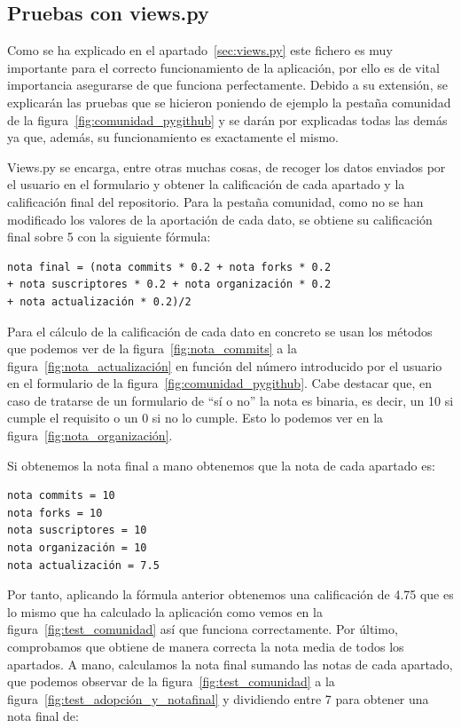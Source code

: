 \documentclass[a4paper, 12pt]{book}
\begin{document}
\subsection{Pruebas con views.py}

Como se ha explicado en el apartado~\ref{sec:views.py} este fichero es muy importante para el correcto funcionamiento de la aplicación, por ello es de vital importancia asegurarse de que funciona perfectamente. Debido a su extensión, se explicarán las pruebas que se hicieron poniendo de ejemplo la pestaña comunidad de la figura~\ref{fig:comunidad_pygithub} y se darán por explicadas todas las demás ya que, además, su funcionamiento es exactamente el mismo.

Views.py se encarga, entre otras muchas cosas, de recoger los datos enviados por el usuario en el formulario y obtener la calificación de cada apartado y la calificación final del repositorio. Para la pestaña comunidad, como no se han modificado los valores de la aportación de cada dato, se obtiene su calificación final sobre 5 con la siguiente fórmula:

\begin{verbatim}
nota final = (nota commits * 0.2 + nota forks * 0.2
+ nota suscriptores * 0.2 + nota organización * 0.2 
+ nota actualización * 0.2)/2
\end{verbatim}

Para el cálculo de la calificación de cada dato en concreto se usan los métodos que podemos ver de la figura~\ref{fig:nota_commits} a la figura~\ref{fig:nota_actualización} en función del número introducido por el usuario en el formulario de la figura~\ref{fig:comunidad_pygithub}. Cabe destacar que, en caso de tratarse de un formulario de ``sí o no'' la nota es binaria, es decir, un 10 si cumple el requisito o un 0 si no lo cumple. Esto lo podemos ver en la figura~\ref{fig:nota_organización}.

Si obtenemos la nota final a mano obtenemos que la nota de cada apartado es:

\begin{verbatim}
nota commits = 10
nota forks = 10
nota suscriptores = 10
nota organización = 10
nota actualización = 7.5
\end{verbatim}

Por tanto, aplicando la fórmula anterior obtenemos una calificación de 4.75 que es lo mismo que ha calculado la aplicación como vemos en la figura~\ref{fig:test_comunidad} así que funciona correctamente. Por último, comprobamos que obtiene de manera correcta la nota media de todos los apartados. A mano, calculamos la nota final sumando las notas de cada apartado, que podemos observar de la figura~\ref{fig:test_comunidad} a la figura~\ref{fig:test_adopción_y_notafinal} y dividiendo entre 7 para obtener una nota final de:
\end{document}
